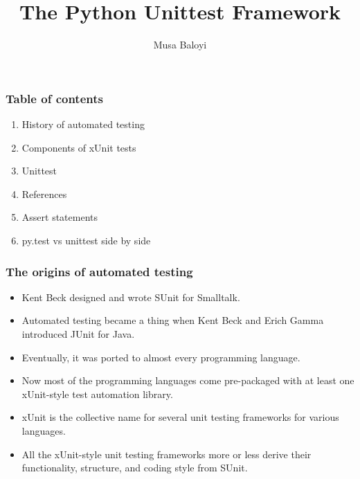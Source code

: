 \documentclass[11pt]{beamer}
\begin{document}
	\author{Musa Baloyi}
	\title{The Python Unittest Framework}
	\begin{frame}[plain]
	\maketitle
\end{frame}

\begin{frame}
\frametitle{Table of contents}
\begin{enumerate}
	\item History of automated testing
	\item Components of xUnit tests
	\item Unittest
	\item References
	\item Assert statements
	\item py.test vs unittest side by side
\end{enumerate}
\end{frame}

\begin{frame}
\frametitle{The origins of automated testing}
\begin{itemize}
	\item Kent Beck designed and wrote SUnit for Smalltalk.
	\item Automated testing became a thing when Kent Beck and Erich Gamma introduced JUnit for Java.
	\item Eventually, it was ported to almost every programming language.
	\item Now most of the programming languages come pre-packaged with at least one xUnit-style test automation library.
	\item xUnit is the collective name for several unit testing frameworks for various languages.
	\item All the xUnit-style unit testing frameworks more or less derive their functionality, structure, and coding style from SUnit.
\end{itemize}
\end{frame}
\end{document}
